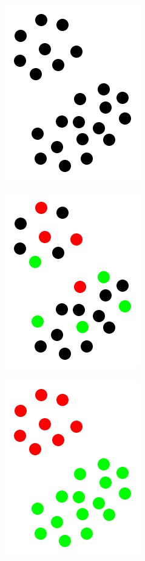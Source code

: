 \documentclass[12pt, a4paper, pdflatex, leqno]{report}
\begin{document}
\begin{figure}[htbp]
\centering
  \begin{subfigure}[b]{0.3\textwidth}
    \centering
    \includegraphics[width=0.5\linewidth]{graphics/cluster1.png}
    \caption{\label{fig:cluster_a}}
  \end{subfigure}
  \begin{subfigure}[b]{0.3\textwidth}
    \centering
    \includegraphics[width=0.5\linewidth]{graphics/cluster2.png}
    \caption{\label{fig:cluster_b}}
  \end{subfigure}
  \begin{subfigure}[b]{0.3\textwidth}
    \centering
    \includegraphics[width=0.5\linewidth]{graphics/cluster3.png}

\end{subfigure}
\end{figure}
\end{document}
